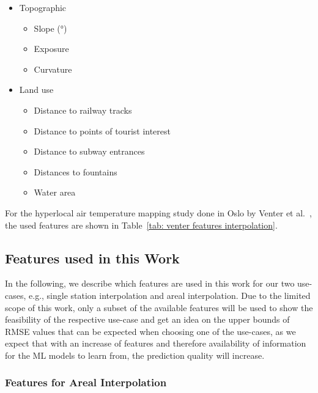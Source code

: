 \begin{itemize}
    \item Topographic

    \begin{itemize}
        \item Slope (°)
        \item Exposure
        \item Curvature
    \end{itemize}
    \item Land use

    \begin{itemize}
        \item Distance to railway tracks
        \item Distance to points of tourist interest
        \item Distance to subway entrances
        \item Distances to fountains
        \item Water area
    \end{itemize}
\end{itemize}

For the hyperlocal air temperature mapping study done in Oslo by Venter et al.~\cite{venter2020hyperlocal}, the used features are shown in Table~\ref{tab: venter features interpolation}.

\subsection{Features used in this Work}

In the following, we describe which features are used in this work for our two use-cases, e.g., single station interpolation and areal interpolation. Due to the limited scope of this work, only a subset of the available features will be used to show the feasibility of the respective use-case and get an idea on the upper bounds of RMSE values that can be expected when choosing one of the use-cases, as we expect that with an increase of features and therefore availability of information for the ML models to learn from, the prediction quality will increase.

\subsubsection{Features for Areal Interpolation}

